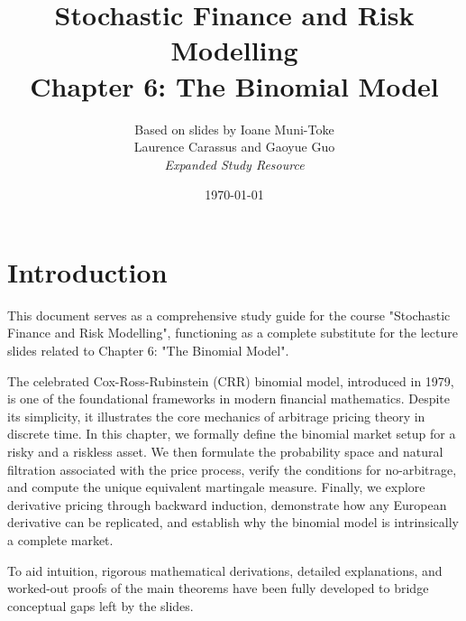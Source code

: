 \documentclass[12pt, a4paper]{report}
\title{\textbf{Stochastic Finance and Risk Modelling} \\ \large Chapter 6: The Binomial Model}
\author{Based on slides by Ioane Muni-Toke \\ Laurence Carassus and Gaoyue Guo \\ \textit{Expanded Study Resource}}
\date{\today}
\theoremstyle{definition}
\begin{document}
\maketitle

\tableofcontents

\chapter*{Introduction}
This document serves as a comprehensive study guide for the course "Stochastic Finance and Risk Modelling", functioning as a complete substitute for the lecture slides related to Chapter 6: "The Binomial Model".

The celebrated Cox-Ross-Rubinstein (CRR) binomial model, introduced in 1979, is one of the foundational frameworks in modern financial mathematics. Despite its simplicity, it illustrates the core mechanics of arbitrage pricing theory in discrete time. In this chapter, we formally define the binomial market setup for a risky and a riskless asset. We then formulate the probability space and natural filtration associated with the price process, verify the conditions for no-arbitrage, and compute the unique equivalent martingale measure. Finally, we explore derivative pricing through backward induction, demonstrate how any European derivative can be replicated, and establish why the binomial model is intrinsically a complete market. 

To aid intuition, rigorous mathematical derivations, detailed explanations, and worked-out proofs of the main theorems have been fully developed to bridge conceptual gaps left by the slides.





\end{document}
